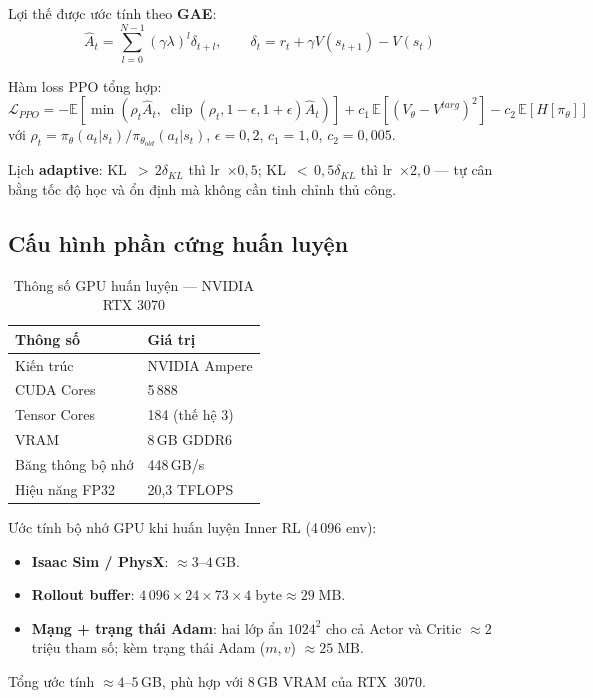 Lợi thế được ước tính theo \textbf{GAE}:
\begin{equation}
    \hat{A}_t = \sum_{l=0}^{N-1}(\gamma\lambda)^l\delta_{t+l},
    \qquad \delta_t = r_t + \gamma V(s_{t+1}) - V(s_t)
    \label{eq:gae}
\end{equation}

Hàm loss PPO tổng hợp:
\begin{equation}
    \mathcal{L}_{PPO} =
    -\mathbb{E}\!\left[\min\!\left(\rho_t\hat{A}_t,\;
        \operatorname{clip}(\rho_t,1\!-\!\epsilon,1\!+\!\epsilon)\hat{A}_t\right)\right]
    + c_1\,\mathbb{E}\!\left[(V_\theta-V^{targ})^2\right]
    - c_2\,\mathbb{E}\!\left[H[\pi_\theta]\right]
    \label{eq:ppo_loss}
\end{equation}
với $\rho_t=\pi_\theta(a_t|s_t)/\pi_{\theta_{old}}(a_t|s_t)$,
$\epsilon{=}0{,}2$, $c_1{=}1{,}0$, $c_2{=}0{,}005$.

Lịch \textbf{adaptive}: KL~$>\,2\delta_{KL}$ thì lr~$\times0{,}5$;
KL~$<\,0{,}5\delta_{KL}$ thì lr~$\times2{,}0$ — tự cân bằng tốc độ học
và ổn định mà không cần tinh chỉnh thủ công.


\subsection{Cấu hình phần cứng huấn luyện}

\begin{table}[H]
    \centering
    \caption{Thông số GPU huấn luyện — NVIDIA RTX 3070}
    \label{tab:gpu_spec}
    \renewcommand{\arraystretch}{1.3}
    \begin{tabular}{|l|l|}
    \hline
    \textbf{Thông số} & \textbf{Giá trị} \\
    \hline
    Kiến trúc         & NVIDIA Ampere \\
    CUDA Cores        & 5\,888 \\
    Tensor Cores      & 184 (thế hệ 3) \\
    VRAM              & 8\,GB GDDR6 \\
    Băng thông bộ nhớ & 448\,GB/s \\
    Hiệu năng FP32    & 20{,}3 TFLOPS \\
    \hline
    \end{tabular}
\end{table}

Ước tính bộ nhớ GPU khi huấn luyện Inner RL (4\,096 env):
\begin{itemize}
    \item \textbf{Isaac Sim / PhysX}: $\approx3$--$4$\,GB.
    \item \textbf{Rollout buffer}:
    $4\,096\times24\times73\times4\;\text{byte}\approx29\;\text{MB}$.
    \item \textbf{Mạng + trạng thái Adam}: hai lớp ẩn $1024^2$ cho cả Actor và
    Critic $\approx2$ triệu tham số; kèm trạng thái Adam ($m,v$)
    $\approx25\;\text{MB}$.
\end{itemize}
Tổng ước tính $\approx4$--$5$\,GB, phù hợp với 8\,GB VRAM của RTX~3070.
